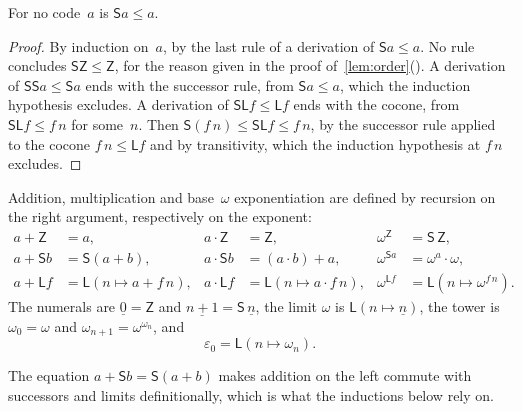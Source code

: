 \documentclass[11pt]{amsart}
\makeatletter
\newcommand{\bZ}{\mathsf{Z}}
\newcommand{\bS}{\mathsf{S}}
\newcommand{\bL}{\mathsf{L}}
\newcommand{\bplus}{\mathbin{+}}
\newcommand{\btimes}{\mathbin{\cdot}}
\newcommand{\num}[1]{\underline{#1}}          %
\newcommand{\eps}{\varepsilon_{0}}
\newcommand{\tower}[1]{\omega_{#1}}           %
\newif\ifagdarefs
\newcommand{\AgdaRefs}[1]{\ifagdarefs{\footnotesize\color{agdablue}(#1)}\else\unskip\fi}
\newcommand{\Agda}[2]{{\footnotesize\color{agdablue}\textsf{#1}%
  \ifblank{#2}{}{\texttt{.}\allowbreak\texttt{#2}}}}
\let\ttt@plain\texttt
\renewcommand{\texttt}[1]{{\footnotesize\color{agdablue}\ttt@plain{#1}}}
\theoremstyle{plain}
\theoremstyle{definition}
\makeatother
\begin{document}
\begin{lemma}[Irreflexivity]
\label{lem:irrefl}
For no code~$a$ is $\bS a \le a$.
\AgdaRefs{\Agda{DialogueTrees.Examples}{S-irrefl}.}
\end{lemma}

\begin{proof}
By induction on~$a$, by the last rule of a derivation of
$\bS a \le a$. No rule concludes $\bS\bZ \le \bZ$, for the reason
given in the proof of~\cref{lem:order}(). A
derivation of $\bS\bS a \le \bS a$ ends with the successor rule, from
$\bS a \le a$, which the induction hypothesis excludes. A derivation of
$\bS\bL f \le \bL f$ ends with the cocone, from $\bS\bL f \le f\,n$
for some~$n$. Then $\bS(f\,n) \le \bS\bL f \le f\,n$, by the successor
rule applied to the cocone $f\,n \le \bL f$ and by transitivity, which
the induction hypothesis at $f\,n$ excludes.
\end{proof}

\begin{definition}
\label{def:arithmetic}
Addition, multiplication and base~$\omega$ exponentiation are defined
by recursion on the right argument, respectively on the exponent:
\begin{align*}
  a \bplus \bZ    &= a ,                      &
  a \btimes \bZ   &= \bZ ,                    &
  \omega^{\bZ}    &= \bS\,\bZ ,               \\
  a \bplus \bS b  &= \bS (a \bplus b) ,       &
  a \btimes \bS b &= (a \btimes b) \bplus a , &
  \omega^{\bS a}  &= \omega^{a} \btimes \omega , \\
  a \bplus \bL f  &= \bL (n \mapsto a \bplus f\,n) , &
  a \btimes \bL f &= \bL (n \mapsto a \btimes f\,n) , &
  \omega^{\bL f}  &= \bL (n \mapsto \omega^{f\,n}) .
\end{align*}
The numerals are $\num 0 = \bZ$ and $\num{n+1} = \bS\,\num n$, the
limit $\omega$ is $\bL(n\mapsto\num n)$, the tower is
$\tower 0 = \omega$ and $\tower{n+1} = \omega^{\tower n}$, and
\[
  \eps = \bL(n \mapsto \tower n) .
\]
\AgdaRefs{\Agda{BrouwerOrdinals.Order}{\_⊕\_};
\Agda{BrouwerOrdinals.Multiplication}{ι[\_]}, \texttt{ω}, \texttt{\_⊗\_};
\Agda{BrouwerOrdinals.Epsilon0}{ω\^{}\_}, \texttt{tower}, \texttt{ε₀}.}
\end{definition}

The equation $a \bplus \bS b = \bS(a \bplus b)$ makes addition on the
left commute with successors and limits definitionally, which is what
the inductions below rely on.
\end{document}
